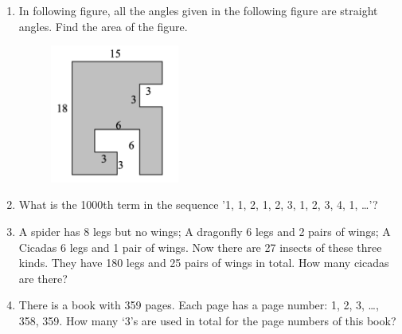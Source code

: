 \documentclass[11pt]{scrartcl}
\begin{document}
\hrulefill %
\begin{enumerate}[resume]
    \item In following figure, all the angles given in the following figure are straight angles. Find the area of the figure.
    \begin{figure}[h]
        \centering
        \includegraphics[width=0.4\textwidth]{StarGen/AIMO Trial G3-4 2024/nazi-area.png}
    \end{figure}
    
    \item \vspace{10cm} What is the 1000th term in the sequence '1, 1, 2, 1, 2, 3, 1, 2, 3, 4, 1, \ldots'?

    \newpage

    \item \vspace{10cm} A spider has 8 legs but no wings; A dragonfly 6 legs and 2 pairs of wings; A Cicadas 6 legs and 1 pair of wings. Now there are 27 insects of these three kinds. They have 180 legs and 25 pairs of wings in total. How many cicadas are there?
    
    \item \vspace{10cm} There is a book with 359 pages. Each page has a page number: 1, 2, 3, \ldots, 358, 359. How many ‘3’s are used in total for the page numbers of this book? 
\end{enumerate}
\end{document}
